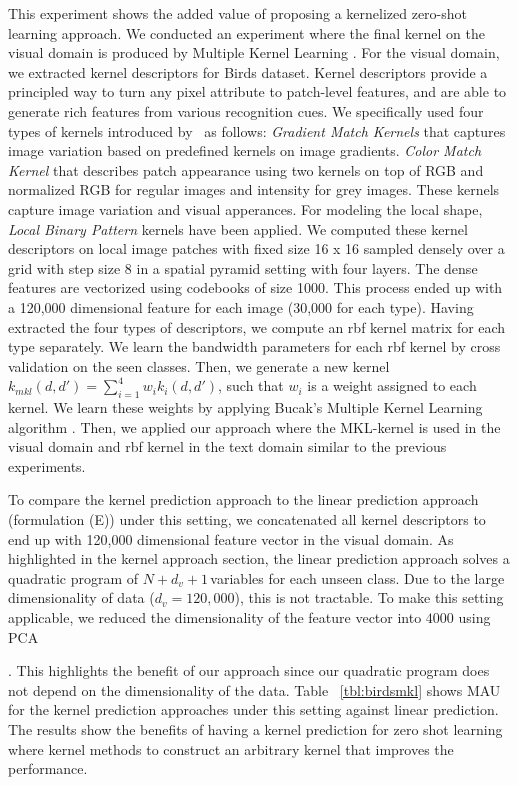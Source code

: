 This experiment shows the added value of  proposing a kernelized zero-shot learning approach. We conducted an experiment where the final kernel on the visual domain is produced by Multiple Kernel Learning \cite{MKKLAlgs11}. For the visual domain, we extracted kernel descriptors for Birds dataset. Kernel descriptors provide a principled way to turn any pixel attribute to patch-level features, and are able to generate rich features from various recognition cues. We specifically used four types of kernels introduced by~\cite{bo_nips10} as follows: \textit{Gradient Match Kernels} that captures image variation based on predefined kernels on image gradients. \textit{Color Match Kernel} that describes patch appearance using two kernels on top of RGB and normalized RGB for regular images and intensity for grey images. These kernels capture image variation and visual apperances. For modeling the local shape, \textit{Local Binary Pattern} kernels have been applied. We computed these kernel descriptors on local image patches with fixed size 16 x 16 sampled densely over a grid with step size 8 in a spatial pyramid setting with four layers. The dense features are vectorized using codebooks of size 1000. This process ended up with a 120,000 dimensional feature for each image (30,000 for each type). Having extracted the four types of descriptors, we compute an rbf kernel matrix for each type separately. We learn the bandwidth parameters for each rbf kernel by cross validation on the seen classes. Then, we generate a new kernel \small$k_{mkl}(d, d') = \sum_{i=1}^4 w_i k_i(d, d')$\normalsize, such that $w_i$ is a weight assigned to each kernel. We learn these weights by applying Bucak's Multiple Kernel Learning algorithm \cite{nips10_Bucak}. Then, we applied our approach where the MKL-kernel is used in the visual domain and rbf kernel in the text domain similar to the previous experiments.



 To compare the kernel prediction approach to the linear prediction approach (formulation (E)) under this setting,  we concatenated  all kernel descriptors to end up with  120,000 dimensional feature vector in the visual domain. As highlighted in  the kernel approach section, the linear prediction approach solves a quadratic program of \small$N+d_v+1\,$\normalsize variables for each unseen class.   Due to the large dimensionality of data  (\small$d_v = 120,000$\normalsize), this is not tractable. To make this setting applicable, we reduced the dimensionality of the feature vector into $4000$ using PCA. This highlights the benefit of our approach since our quadratic program does not depend on the dimensionality of the data. Table ~\ref{tbl:birdsmkl} shows MAU for the kernel prediction approaches under this setting against  linear prediction. The results show the benefits of having a kernel prediction for zero shot learning where kernel methods to construct an arbitrary kernel that  improves the performance.

